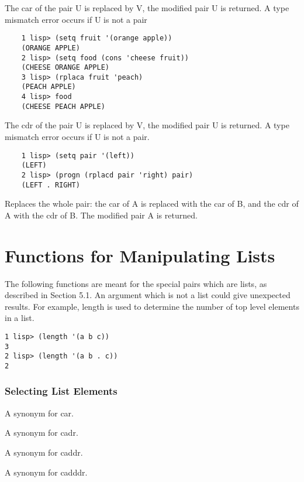 {    The  car of the pair U is replaced by V, the modified pair U
    is returned.  A type mismatch error occurs if  U  is  not  a
    pair
}
\begin{verbatim}
    1 lisp> (setq fruit '(orange apple))
    (ORANGE APPLE)
    2 lisp> (setq food (cons 'cheese fruit))
    (CHEESE ORANGE APPLE)
    3 lisp> (rplaca fruit 'peach)
    (PEACH APPLE)
    4 lisp> food
    (CHEESE PEACH APPLE)
\end{verbatim}

{    The  cdr of the pair U is replaced by V, the modified pair U
    is returned.  A type mismatch error occurs if  U  is  not  a
    pair.
}
\begin{verbatim}
    1 lisp> (setq pair '(left))
    (LEFT)
    2 lisp> (progn (rplacd pair 'right) pair)
    (LEFT . RIGHT)
\end{verbatim}

{    Replaces  the whole pair:  the car of A is replaced with the
    car of B, and the cdr of A with the cdr of B.  The  modified
    pair A is returned.
}
\section{Functions for Manipulating Lists}

The  following functions are meant for the special pairs which
are lists, as described in Section 5.1.  An  argument  which  is
not  a  list could give unexpected results.  For example, length
is used to determine the number of top level elements in a list.

\begin{verbatim}
1 lisp> (length '(a b c))
3
2 lisp> (length '(a b . c))
2
\end{verbatim}
\subsubsection{Selecting List Elements}


{    A synonym for car.
}

{    A synonym for cadr.
}

{    A synonym for caddr.
}

{    A synonym for cadddr.
}

